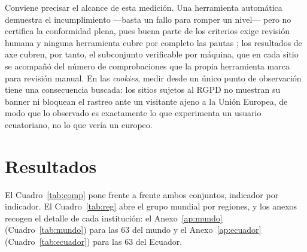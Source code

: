 \documentclass[11pt,a4paper]{article}
\begin{document}
Conviene precisar el alcance de esta medición. Una herramienta automática demuestra el incumplimiento ---basta un fallo para romper un nivel--- pero no certifica la conformidad plena, pues buena parte de los criterios exige revisión humana y ninguna herramienta cubre por completo las pautas \citep{fischer2025coverage}; los resultados de axe cubren, por tanto, el subconjunto verificable por máquina, que en cada sitio se acompañó del número de comprobaciones que la propia herramienta marca para revisión manual. En las \emph{cookies}, medir desde un único punto de observación tiene una consecuencia buscada: los sitios sujetos al RGPD no muestran su banner ni bloquean el rastreo ante un visitante ajeno a la Unión Europea, de modo que lo observado es exactamente lo que experimenta un usuario ecuatoriano, no lo que vería un europeo.

\section{Resultados}\label{sec:resultados}
El Cuadro~\ref{tab:comp} pone frente a frente ambos conjuntos, indicador por indicador. El Cuadro~\ref{tab:reg} abre el grupo mundial por regiones, y los anexos recogen el detalle de cada institución: el Anexo~\ref{ap:mundo} (Cuadro~\ref{tab:mundo}) para las 63 del mundo y el Anexo~\ref{ap:ecuador} (Cuadro~\ref{tab:ecuador}) para las 63 del Ecuador.
\end{document}
